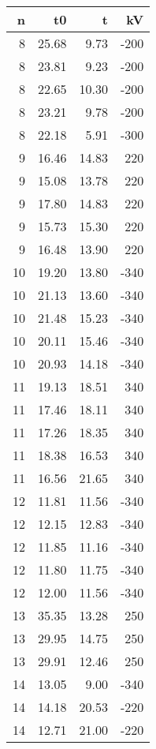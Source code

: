 \begin{tabular}{rrrr}
\toprule
 n &    t0 &     t &   kV \\
\midrule
 8 & 25.68 &  9.73 & -200 \\
 8 & 23.81 &  9.23 & -200 \\
 8 & 22.65 & 10.30 & -200 \\
 8 & 23.21 &  9.78 & -200 \\
 8 & 22.18 &  5.91 & -300 \\
 9 & 16.46 & 14.83 &  220 \\
 9 & 15.08 & 13.78 &  220 \\
 9 & 17.80 & 14.83 &  220 \\
 9 & 15.73 & 15.30 &  220 \\
 9 & 16.48 & 13.90 &  220 \\
10 & 19.20 & 13.80 & -340 \\
10 & 21.13 & 13.60 & -340 \\
10 & 21.48 & 15.23 & -340 \\
10 & 20.11 & 15.46 & -340 \\
10 & 20.93 & 14.18 & -340 \\
11 & 19.13 & 18.51 &  340 \\
11 & 17.46 & 18.11 &  340 \\
11 & 17.26 & 18.35 &  340 \\
11 & 18.38 & 16.53 &  340 \\
11 & 16.56 & 21.65 &  340 \\
12 & 11.81 & 11.56 & -340 \\
12 & 12.15 & 12.83 & -340 \\
12 & 11.85 & 11.16 & -340 \\
12 & 11.80 & 11.75 & -340 \\
12 & 12.00 & 11.56 & -340 \\
13 & 35.35 & 13.28 &  250 \\
13 & 29.95 & 14.75 &  250 \\
13 & 29.91 & 12.46 &  250 \\
14 & 13.05 &  9.00 & -340 \\
14 & 14.18 & 20.53 & -220 \\
14 & 12.71 & 21.00 & -220 \\
\bottomrule
\end{tabular}
